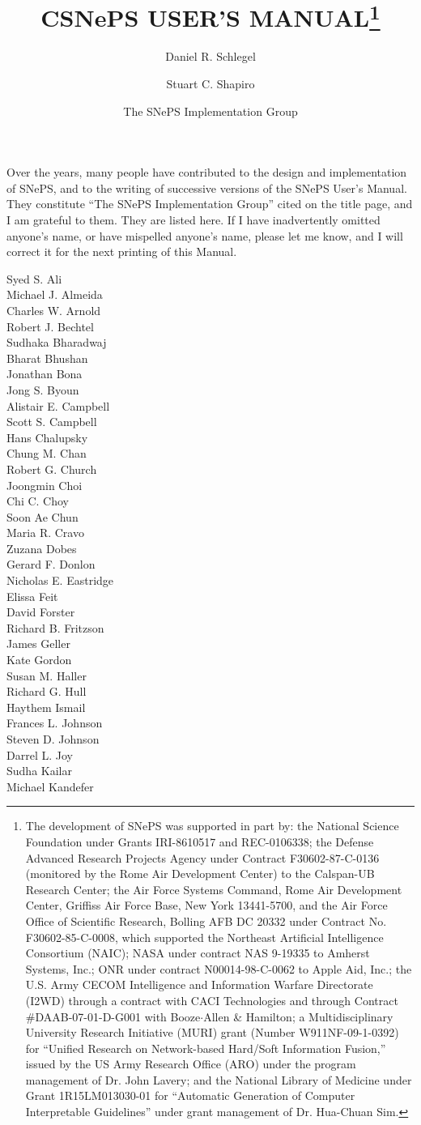 \documentclass[letterpaper,colorlinks=true,linkcolor=blue]{book}
\title{\bf CSNePS USER'S MANUAL\thanks{The development of SNePS was supported
    in part by: the National Science Foundation under Grants IRI-8610517 and
    REC-0106338; the Defense Advanced Research Projects Agency under Contract
    F30602-87-C-0136 (monitored by the Rome Air Development Center) to the
    Calspan-UB Research Center; the Air Force Systems Command, Rome Air
    Development Center, Griffiss Air Force Base, New York 13441-5700, and the
    Air Force Office of Scientific Research, Bolling AFB DC 20332 under Contract
    No.  F30602-85-C-0008, which supported the Northeast Artificial Intelligence
    Consortium (NAIC); NASA under contract NAS 9-19335 to Amherst Systems, Inc.;
    ONR under contract N00014-98-C-0062 to Apple Aid, Inc.; the U.S. Army CECOM
    Intelligence and Information Warfare Directorate (I2WD) through a contract
    with CACI Technologies and through Contract \#DAAB-07-01-D-G001 with
    Booze$\cdot$Allen \& Hamilton; a Multidisciplinary University Research
    Initiative (MURI) grant (Number W911NF-09-1-0392) for ``Unified Research on
    Network-based Hard/Soft Information Fusion,'' issued by the US Army Research
    Office (ARO) under the program management of Dr. John Lavery; and the National
    Library of Medicine under Grant 1R15LM013030-01 for ``Automatic Generation 
    of Computer Interpretable Guidelines'' under grant management of Dr. Hua-Chuan Sim.}}
\author[1]{Daniel R. Schlegel}
\author[2]{Stuart C. Shapiro}
\author[ ]{The SNePS Implementation Group}
\affil[1]{Department of Computer Science\protect\\
State University of New York at Oswego\protect\\
464 Shineman Center\protect\\
Oswego, NY 13126}
\affil[2]{Department of Computer Science and Engineering \protect\\ 
State University of New York at Buffalo  \protect\\ 
338 Davis Hall \protect\\
Buffalo, NY 14260-2500\protect\vspace{1em}}
\begin{document}
\frontmatter
\maketitle

\pagebreak
Over the years, many people have contributed to the design and
implementation of SNePS, and to the writing of successive versions of
the SNePS User's Manual.  They constitute ``The SNePS Implementation
Group'' cited on the title page, and I am grateful to them.  They are
listed here.  If I have inadvertently omitted anyone's name, or have
mispelled anyone's name, please let me know, and I will correct it for
the next printing of this Manual.
\begin{multicols}{3}
\noindent Syed S. Ali\\
Michael J. Almeida\\
Charles W. Arnold\\
Robert J. Bechtel\\
Sudhaka Bharadwaj\\
Bharat Bhushan\\
Jonathan Bona\\
Jong S. Byoun\\
Alistair E. Campbell\\
Scott S. Campbell\\
Hans Chalupsky\\
Chung M. Chan\\
Robert G. Church\\
Joongmin Choi\\
Chi C. Choy\\
Soon Ae Chun\\
Maria R. Cravo\\
Zuzana Dobes\\
Gerard F. Donlon\\
Nicholas E. Eastridge\\
Elissa Feit\\
David Forster\\
Richard B. Fritzson\\
James Geller\\
Kate Gordon\\
Susan M. Haller\\
Richard G. Hull\\
Haythem Ismail\\
Frances L. Johnson\\
Steven D. Johnson\\
Darrel L. Joy\\
Sudha Kailar\\
Michael Kandefer\\

\end{multicols}
\end{document}
